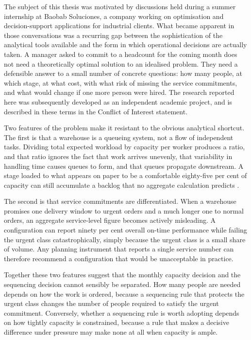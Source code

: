 The subject of this thesis was motivated by discussions held during a summer internship at
Baobab Soluciones, a company working on optimisation and decision-support applications for
industrial clients. What became apparent in those conversations was a recurring gap between
the sophistication of the analytical tools available and the form in which operational
decisions are actually taken. A manager asked to commit to a headcount for the coming month
does not need a theoretically optimal solution to an idealised problem. They need a defensible
answer to a small number of concrete questions: how many people, at which stage, at what cost,
with what risk of missing the service commitments, and what would change if one more person
were hired. The research reported here was subsequently developed as an independent academic
project, and is described in these terms in the Conflict of Interest statement.

Two features of the problem make it resistant to the obvious analytical shortcut. The first is
that a warehouse is a queueing system, not a flow of independent tasks. Dividing total expected
workload by capacity per worker produces a ratio, and that ratio ignores the fact that work
arrives unevenly, that variability in handling time causes queues to form, and that queues
propagate downstream. A stage loaded to what appears on paper to be a comfortable eighty-five
per cent of capacity can still accumulate a backlog that no aggregate calculation predicts
\citep{hopp2011}.

The second is that service commitments are differentiated. When a warehouse promises one
delivery window to urgent orders and a much longer one to normal orders, an aggregate
service-level figure becomes actively misleading. A configuration can report ninety per cent
overall on-time performance while failing the urgent class catastrophically, simply because
the urgent class is a small share of volume. Any planning instrument that reports a single
service number can therefore recommend a configuration that would be unacceptable in practice.

Together these two features suggest that the monthly capacity decision and the sequencing
decision cannot sensibly be separated. How many people are needed depends on how the work is
ordered, because a sequencing rule that protects the urgent class changes the number of people
required to satisfy the urgent commitment. Conversely, whether a sequencing rule is worth
adopting depends on how tightly capacity is constrained, because a rule that makes a decisive
difference under pressure may make none at all when capacity is ample.

